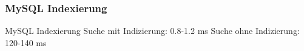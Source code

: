 \subsubsection{MySQL Indexierung} \label{sec:MySQL_Indexierung}
    MySQL Indexierung
    Suche mit Indizierung: 0.8-1.2 ms 
    Suche ohne Indizierung: 120-140 ms